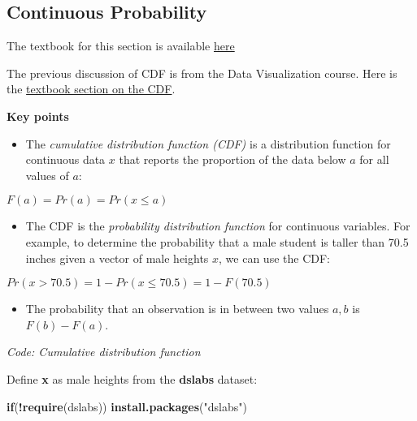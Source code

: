 \documentclass[
]{article}
\newenvironment{Shaded}{\begin{snugshade}}{\end{snugshade}}
\newcommand{\ControlFlowTok}[1]{\textcolor[rgb]{0.13,0.29,0.53}{\textbf{#1}}}
\newcommand{\KeywordTok}[1]{\textcolor[rgb]{0.13,0.29,0.53}{\textbf{#1}}}
\newcommand{\NormalTok}[1]{#1}
\newcommand{\OperatorTok}[1]{\textcolor[rgb]{0.81,0.36,0.00}{\textbf{#1}}}
\newcommand{\StringTok}[1]{\textcolor[rgb]{0.31,0.60,0.02}{#1}}
\providecommand{\tightlist}{%
  \setlength{\itemsep}{0pt}\setlength{\parskip}{0pt}}
\begin{document}
\hypertarget{continuous-probability}{%
\subsection{Continuous Probability}\label{continuous-probability}}

The textbook for this section is available
\href{https://rafalab.github.io/dsbook/probability.html\#continuous-probability}{here}

The previous discussion of CDF is from the Data Visualization course.
Here is the
\href{https://rafalab.github.io/dsbook/distributions.html\#cdf-intro}{textbook
section on the CDF}.

\textbf{Key points}

\begin{itemize}
\tightlist
\item
  The \emph{cumulative distribution function (CDF)} is a distribution
  function for continuous data \(x\) that reports the proportion of the
  data below \(a\) for all values of \(a\):
\end{itemize}

\(F(a) = Pr(a) = Pr(x \le a)\)

\begin{itemize}
\tightlist
\item
  The CDF is the \emph{probability distribution function} for continuous
  variables. For example, to determine the probability that a male
  student is taller than 70.5 inches given a vector of male heights
  \(x\), we can use the CDF:
\end{itemize}

\(Pr(x > 70.5) = 1 − Pr(x \le 70.5) = 1 − F(70.5)\)

\begin{itemize}
\tightlist
\item
  The probability that an observation is in between two values \(a, b\)
  is \(F(b) - F(a)\).
\end{itemize}

\emph{Code: Cumulative distribution function}

Define \textbf{x} as male heights from the \textbf{dslabs} dataset:

\begin{Shaded}
\begin{Highlighting}[]
\ControlFlowTok{if}\NormalTok{(}\OperatorTok{!}\KeywordTok{require}\NormalTok{(dslabs)) }\KeywordTok{install.packages}\NormalTok{(}\StringTok{"dslabs"}\NormalTok{)}
\end{Highlighting}
\end{Shaded}
\end{document}
